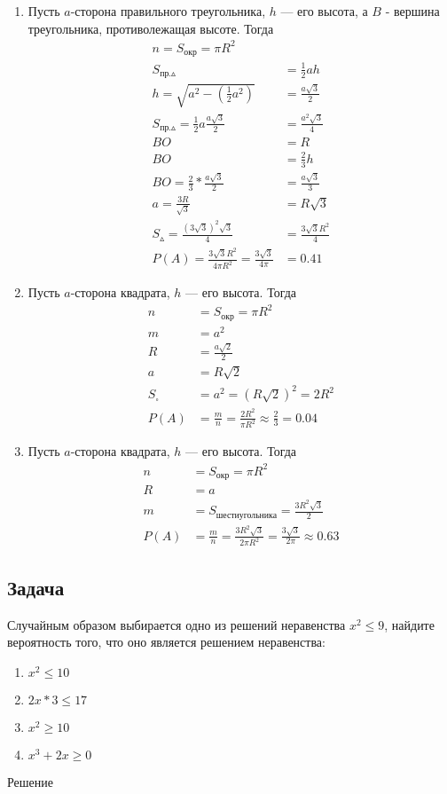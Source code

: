 \documentclass[a4paper,12pt]{extreport}
\begin{document}
\begin{enumerate}
	\item { Пусть $a$-сторона правильного треугольника, $h$ --- его высота, а $B$ - вершина треугольника, противолежащая высоте. Тогда
		\begin{align*}
			n=S_{\text{окр}}=\pi{}R^2\\
			S_{\text{пр.}\vartriangle}&=\frac{1}{2}ah\\
			h=\sqrt{a^2-(\frac{1}{2}a^2)}&=\frac{a\sqrt{3}}{2}\\
			S_{\text{пр.}\vartriangle}=\frac{1}{2}a\frac{a\sqrt{3}}{2}&=\frac{a^2\sqrt{3}}{4}\\
			BO&=R\\
			BO&=\frac{2}{3}h\\
			BO=\frac{2}{3}*\frac{a\sqrt{3}}{2}&=\frac{a\sqrt{3}}{3}\\
			a=\frac{3R}{\sqrt{3}}&=R\sqrt{3}\\
			S_{\vartriangle}=\frac{(3\sqrt{3})^2\sqrt{3}}{4}&=\frac{3\sqrt{3}R^2}{4}\\
			P(A)=\frac{3\sqrt{3}R^2}{4\pi{}R^2}=\frac{3\sqrt{3}}{4\pi}&=0.41
		\end{align*}
	}
	\item { Пусть $a$-сторона квадрата, $h$ --- его высота. Тогда
		\begin{align*}
			n&=S_{\text{окр}}=\pi{}R^2\\
			m&=a^2\\
			R&=\frac{a\sqrt{2}}{2}\\
			a&=R\sqrt{2}\\
			S_\square&=a^2=(R\sqrt{2})^2=2R^2\\
			P(A)&=\frac{m}{n}=\frac{2R^2}{\pi{}R^2}\approx\frac{2}{3}=0.04
		\end{align*}
	}	
	\item { Пусть $a$-сторона квадрата, $h$ --- его высота. Тогда
		\begin{align*}			
			n&=S_{\text{окр}}=\pi{}R^2\\
			R&=a\\
			m&=S_{\text{шестиугольника}}=\frac{3R^2\sqrt{3}}{2}\\
			P(A)&=\frac{m}{n}=\frac{3R^2\sqrt{3}}{2\pi{}R^2}=\frac{3\sqrt{3}}{2\pi}\approx0.63
		\end{align*}
	}		
\end{enumerate}

\subsection{Задача}
Случайным образом выбирается одно из решений неравенства $x^2\leq9$, найдите вероятность того, что оно является решением неравенства:

\begin{enumerate}
	\item $x^2\leq10$
	\item $2x*3\leq17$
	\item $x^2\geq10$
	\item $x^3+2x\geq0$
\end{enumerate}

\begin{center}
Решение
\end{center}
\end{document}
